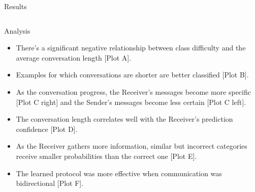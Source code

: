\documentclass[final]{beamer}
\newlength{\onecolwid}
\newlength{\twocolwid}
\begin{document}
\begin{frame}[t]
\begin{columns}[t]
\begin{column}{\twocolwid}
\begin{block}{Results}




\end{block}

\begin{columns}[t,totalwidth=\twocolwid] %

\begin{column}{\onecolwid} %



\begin{block}{Analysis}

\begin{itemize}
\item There's a significant negative relationship between class difficulty and the average conversation length [Plot A].
\item Examples for which conversations are shorter are better classified [Plot B].
\item As the conversation progress, the Receiver's messages become more specific [Plot C right] and the Sender's messages become less certain [Plot C left].
\item The conversation length correlates well with the Receiver's prediction confidence [Plot D].
\item As the Receiver gathers more information, similar but incorrect categories receive smaller probabilities than the correct one [Plot E].
\item The learned protocol was more effective when communication was bidirectional [Plot F].
\end{itemize}


\end{block}
\end{column}
\end{columns}
\end{column}
\end{columns}
\end{frame}
\end{document}
